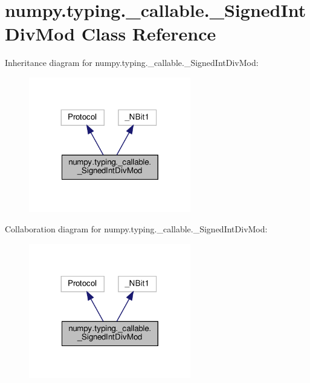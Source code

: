 \hypertarget{classnumpy_1_1typing_1_1__callable_1_1__SignedIntDivMod}{}\section{numpy.\+typing.\+\_\+callable.\+\_\+\+Signed\+Int\+Div\+Mod Class Reference}
\label{classnumpy_1_1typing_1_1__callable_1_1__SignedIntDivMod}


Inheritance diagram for numpy.\+typing.\+\_\+callable.\+\_\+\+Signed\+Int\+Div\+Mod\+:
\nopagebreak
\begin{figure}[H]
\begin{center}
\leavevmode
\includegraphics[width=200pt]{classnumpy_1_1typing_1_1__callable_1_1__SignedIntDivMod__inherit__graph}
\end{center}
\end{figure}


Collaboration diagram for numpy.\+typing.\+\_\+callable.\+\_\+\+Signed\+Int\+Div\+Mod\+:
\nopagebreak
\begin{figure}[H]
\begin{center}
\leavevmode
\includegraphics[width=200pt]{classnumpy_1_1typing_1_1__callable_1_1__SignedIntDivMod__coll__graph}
\end{center}
\end{figure}
